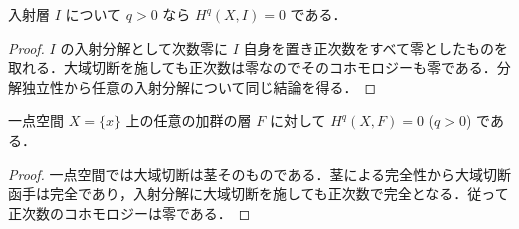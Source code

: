 \begin{prop}[入射層の高次コホモロジー]
入射層 $I$ について $q>0$ なら $H^q(X,I)=0$ である．
\end{prop}
\begin{proof}
$I$ の入射分解として次数零に $I$ 自身を置き正次数をすべて零としたものを取れる．大域切断を施しても正次数は零なのでそのコホモロジーも零である．分解独立性から任意の入射分解について同じ結論を得る．
\end{proof}
\begin{example}[一点空間のコホモロジー]
一点空間 $X=\{x\}$ 上の任意の加群の層 $F$ に対して $H^q(X,F)=0$ ($q>0$) である．
\end{example}
\begin{proof}
一点空間では大域切断は茎そのものである．茎による完全性から大域切断函手は完全であり，入射分解に大域切断を施しても正次数で完全となる．従って正次数のコホモロジーは零である．
\end{proof}
